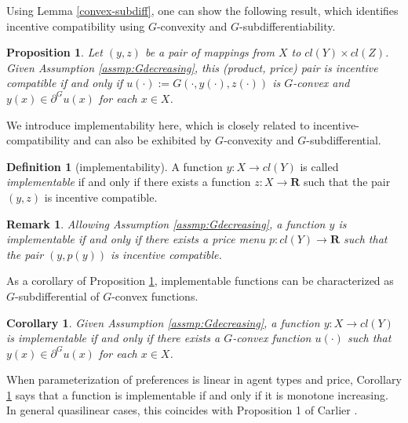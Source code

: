 \documentclass[a4paper, 11pt]{amsart}
\numberwithin{equation}{section}
\theoremstyle{plain}
\newtheorem{corollary}[theorem]{Corollary}
\newtheorem{proposition}[theorem]{Proposition}
\newtheorem{remark}[theorem]{Remark}
\theoremstyle{definition}
\newtheorem{definition}[theorem]{Definition}
\theoremstyle{remark}
\newcommand{\R}{\mathbf{R}}
\begin{document}
Using Lemma \ref{convex-subdiff}, one can show the following result, which identifies incentive compatibility using $G$-convexity and $G$-subdifferentiability.

\begin{proposition}\label{incen/convex}
	Let $(y,z)$ be a pair of mappings from $X$ to $cl(Y) \times cl(Z)$. Given Assumption \ref{assmp:Gdecreasing}, this (product, price) pair is incentive compatible %
	if and only if $u(\cdot):=G(\cdot,y(\cdot),z(\cdot))$ is $G$-convex and $y(x)\in \partial^G u(x)$ for each $x \in X$.
\end{proposition}



{We introduce implementability here, which is closely related to incentive-compatibility and can also be exhibited by $G$-convexity and $G$-subdifferential. %
	
\begin{definition}[implementability]
		A function $y: X \longrightarrow cl(Y)$ is called \textit{implementable} if and only if there exists a function $z: X \longrightarrow \R$  such that the pair $(y, z)$ is incentive compatible.
\end{definition}

\begin{remark}\label{rmk:implementability}
	Allowing Assumption \ref{assmp:Gdecreasing}, a function $y$ is implementable if and only if there exists a price menu $p: cl(Y) \longrightarrow \R$ such that the pair $(y, p(y))$ is incentive compatible.
\end{remark}


As a corollary of Proposition \ref{incen/convex},  implementable functions can be characterized as $G$-subdifferential of $G$-convex functions. 


\begin{corollary}\label{cor:implementable}
	Given Assumption \ref{assmp:Gdecreasing}, a function $y: X \longrightarrow cl(Y)$ is implementable if and only if there exists a $G$-convex function $u(\cdot)$ such that $y(x) \in \partial^G u(x)$ for each $x\in X$.
\end{corollary}
}

When parameterization of preferences is linear in agent types and price, Corollary \ref{cor:implementable} says that a function is implementable if and only if it is monotone increasing. In general quasilinear cases, this coincides with Proposition 1 of Carlier \cite{Carlier01}. \medskip
\end{document}
